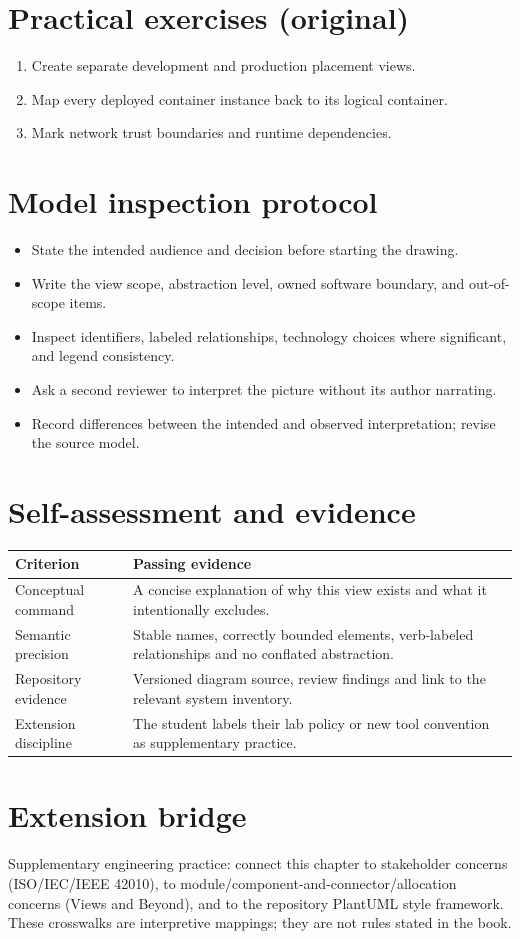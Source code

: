 \documentclass[10pt,letterpaper]{article}
\begin{document}
\section{Practical exercises (original)}
\begin{enumerate}
\item Create separate development and production placement views.
\item Map every deployed container instance back to its logical container.
\item Mark network trust boundaries and runtime dependencies.
\end{enumerate}

\section{Model inspection protocol}
\begin{itemize}
\item State the intended audience and decision before starting the drawing.
\item Write the view scope, abstraction level, owned software boundary, and out-of-scope items.
\item Inspect identifiers, labeled relationships, technology choices where significant, and legend consistency.
\item Ask a second reviewer to interpret the picture without its author narrating.
\item Record differences between the intended and observed interpretation; revise the source model.
\end{itemize}

\section{Self-assessment and evidence}
\begin{tabularx}{\linewidth}{@{}YY@{}}\toprule
\textbf{Criterion} & \textbf{Passing evidence} \\ \midrule
Conceptual command & A concise explanation of why this view exists and what it intentionally excludes. \\
Semantic precision & Stable names, correctly bounded elements, verb-labeled relationships and no conflated abstraction. \\
Repository evidence & Versioned diagram source, review findings and link to the relevant system inventory. \\
Extension discipline & The student labels their lab policy or new tool convention as supplementary practice. \\
\bottomrule\end{tabularx}


\section{Extension bridge}
Supplementary engineering practice: connect this chapter to stakeholder concerns (ISO/IEC/IEEE 42010), to module/component-and-connector/allocation concerns (Views and Beyond), and to the repository PlantUML style framework. These crosswalks are interpretive mappings; they are not rules stated in the book.
\end{document}

